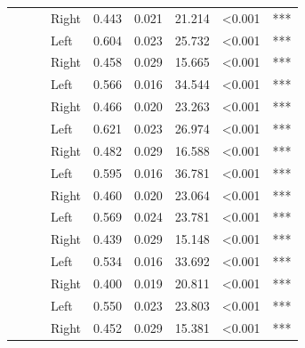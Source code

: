 \begin{longtable}[t]{>{\raggedright\arraybackslash}t{4cm}>{\raggedright\arraybackslash}t{4cm}>{\raggedright\arraybackslash}t{2.5cm}lrrrll}
\nopagebreak
 &  &  & Right & 0.443 & 0.021 & 21.214 & <0.001 & ***\\
\nopagebreak
 &  &  & Left & 0.604 & 0.023 & 25.732 & <0.001 & ***\\
\nopagebreak
 &  &  & Right & 0.458 & 0.029 & 15.665 & <0.001 & ***\\
\nopagebreak
 &  &  & Left & 0.566 & 0.016 & 34.544 & <0.001 & ***\\
\nopagebreak
 &  &  & Right & 0.466 & 0.020 & 23.263 & <0.001 & ***\\
\nopagebreak
 &  &  & Left & 0.621 & 0.023 & 26.974 & <0.001 & ***\\
\nopagebreak
 &  &  & Right & 0.482 & 0.029 & 16.588 & <0.001 & ***\\
\nopagebreak
 &  &  & Left & 0.595 & 0.016 & 36.781 & <0.001 & ***\\
\nopagebreak
{} &  &  & Right & 0.460 & 0.020 & 23.064 & <0.001 & ***\\
\pagebreak[0]
 &  &  & Left & 0.569 & 0.024 & 23.781 & <0.001 & ***\\
\nopagebreak
 &  &  & Right & 0.439 & 0.029 & 15.148 & <0.001 & ***\\
\nopagebreak
 &  &  & Left & 0.534 & 0.016 & 33.692 & <0.001 & ***\\
\nopagebreak
 &  &  & Right & 0.400 & 0.019 & 20.811 & <0.001 & ***\\
\nopagebreak
 &  &  & Left & 0.550 & 0.023 & 23.803 & <0.001 & ***\\
\nopagebreak
 &  &  & Right & 0.452 & 0.029 & 15.381 & <0.001 & ***\\

\end{longtable}

